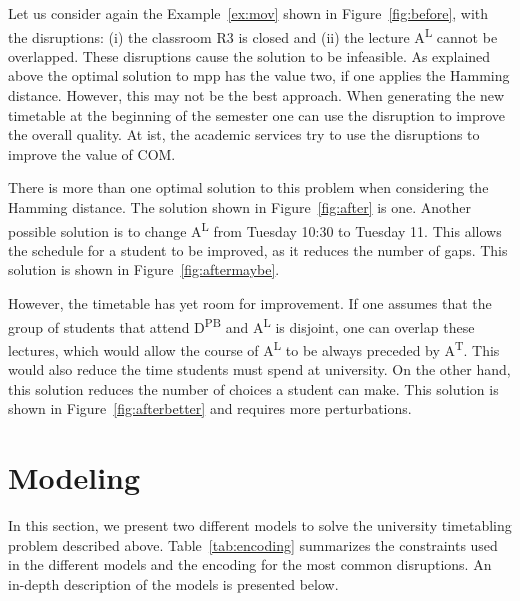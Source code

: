 \documentclass[twocolumn,natbib]{svjour3}          %
\newcounter{constraint}
\begin{document}
\begin{example}
Let us consider again the Example~\ref{ex:mov} shown in Figure~\ref{fig:before}, with the disruptions: (i) the classroom R3 is closed and (ii) the lecture A\textsuperscript{L} cannot be overlapped. These disruptions cause the solution to be infeasible. As explained above the optimal solution to \gls{mpp} has the value two, if one applies the Hamming distance. However, this may not be the best approach. When generating the new timetable at the beginning of the semester one can use the disruption to improve the overall quality. At \gls{ist}, the academic services try to use the disruptions to improve the value of COM.

There is more than one optimal solution to this problem when considering the Hamming distance. The solution shown in Figure~\ref{fig:after} is one. Another possible solution is to change A\textsuperscript{L} from Tuesday 10:30 to Tuesday 11. This allows the schedule for a student to be improved, as it reduces the number of gaps. This solution is shown in Figure~\ref{fig:aftermaybe}.

However, the timetable has yet room for improvement. If one assumes that the group of students that attend D\textsuperscript{PB} and A\textsuperscript{L} is disjoint, one can overlap these lectures, which would allow the course of A\textsuperscript{L} to be always preceded by A\textsuperscript{T}. This would also reduce the time students must spend at university. On the other hand, this solution reduces the number of choices a student can make. This solution is shown in Figure~\ref{fig:afterbetter} and requires more perturbations.
\end{example}

\section{Modeling}
\label{sec:model}
In this section, we present two different models to solve the university timetabling problem described above. Table~\ref{tab:encoding} summarizes the constraints used in the different models and the encoding for the most common disruptions.  An in-depth description of the models is presented below. 
\end{document}
